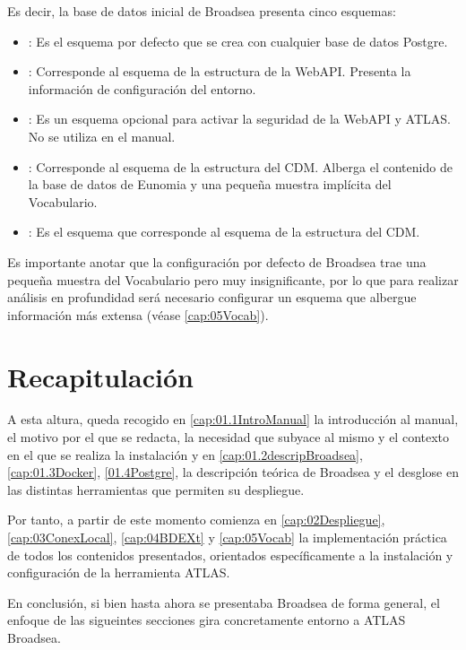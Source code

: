 Es decir, la base de datos inicial de Broadsea presenta cinco esquemas:

\begin{itemize}
    \item {}: Es el esquema por defecto que se crea con cualquier base de datos Postgre.
    \item {}: Corresponde al esquema  de la estructura de la WebAPI. Presenta la información de configuración del entorno.
    \item {}: Es un esquema opcional para activar la seguridad de la WebAPI y ATLAS. No se utiliza en el manual.
    \item {}: Corresponde al esquema  de la estructura del CDM. Alberga el contenido de la base de datos de Eunomia y una pequeña muestra implícita del Vocabulario.
    \item {}:  Es el esquema que corresponde al esquema  de la estructura del CDM.
\end{itemize}

Es importante anotar que la configuración por defecto de Broadsea trae una pequeña muestra del Vocabulario pero muy insignificante, por lo que para realizar análisis en profundidad será necesario configurar un esquema que albergue información más extensa (véase \ref{cap:05Vocab}).

\section{Recapitulación}

A esta altura, queda recogido en \ref{cap:01.1IntroManual} la introducción al manual, el motivo por el que se redacta, la necesidad que subyace al mismo y el contexto en el que se realiza la instalación y  en \ref{cap:01.2descripBroadsea}, \ref{cap:01.3Docker}, \ref{01.4Postgre}, la descripción teórica de Broadsea y el desglose en las distintas herramientas que permiten su despliegue.

Por tanto, a partir de este momento comienza en \ref{cap:02Despliegue}, \ref{cap:03ConexLocal}, \ref{cap:04BDEXt} y \ref{cap:05Vocab} la implementación práctica de todos los contenidos presentados, orientados específicamente a la instalación y configuración de la herramienta ATLAS. 

En conclusión, si bien hasta ahora se presentaba Broadsea de forma general, el enfoque de las sigueintes secciones gira concretamente entorno a ATLAS Broadsea.



